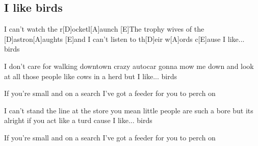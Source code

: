 \subsection*{I like birds   }
\begin{guitar}
[E]I can't watch the r[D]ocketl[A]aunch
[E]The trophy wives of the [D]astron[A]aughts
[E]and I can't listen to th[D]eir w[A]ords
c[E]ause I like... birds



I don't care for walking downtown
crazy autocar gonna mow me down
and look at all those people like cows in a herd
but I like... birds



If you're small and on a search
I've got a feeder for you to perch on



I can't stand the line at the store
you mean little people are such a bore
but its alright if you act like a turd
cause I like... birds



If you're small and on a search 
I've got a feeder for you to perch on
\end{guitar}
